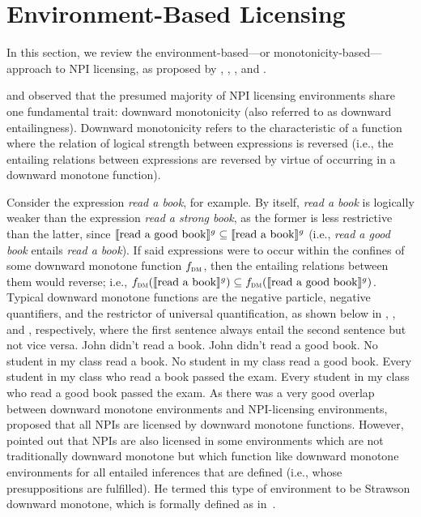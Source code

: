 \section{Environment-Based Licensing}
In this section, we review the environment-based---or monotonicity-based---approach to NPI licensing, as proposed by \textcite{Fauconnier1975a,Fauconnier1975b}, \textcite{Ladusaw1980}, \textcite{Giannakidou1998}, and \textcite{Fintel1999,Fintel2001}.

\textcite{Fauconnier1975a,Fauconnier1975b} and \textcite{Ladusaw1980} observed that the presumed majority of NPI licensing environments share one fundamental trait: downward monotonicity (also referred to as downward entailingness). Downward monotonicity refers to the characteristic of a function where the relation of logical strength between expressions is reversed (i.e., the entailing relations between expressions are reversed by virtue of occurring in a downward monotone function).
\ex\label{def:dm}%

\xe
Consider the expression \textit{read a book}, for example. By itself, \textit{read a book} is logically weaker than the expression \textit{read a strong book}, as the former is less restrictive than the latter, since $\llbracket\text{read a good book}\rrbracket^{g}\subseteq\llbracket\text{read a book}\rrbracket^{g}$ (i.e., \textit{read a good book} entails \textit{read a book}). If said expressions were to occur within the confines of some downward monotone function $f_\text{\scshape dm}$, then the entailing relations between them would reverse; i.e., $f_\text{\scshape dm}(\llbracket\text{read a book}\rrbracket^{g})\subseteq f_\text{\scshape dm}(\llbracket\text{read a good book}\rrbracket^{g})$. Typical downward monotone functions are the negative particle, negative quantifiers, and the restrictor of universal quantification, as shown below in , , and , respectively, where the first sentence always entail the second sentence but not vice versa.
\pex\label{ex:dm-neg}
\a John didn't read a book.
\a John didn't read a good book.
\xe
\pex\label{ex:dm-negquant}
\a No student in my class read a book.
\a No student in my class read a good book.
\xe
\pex\label{ex:dm-every}
\a Every student in my class who read a book passed the exam.
\a Every student in my class who read a good book passed the exam.
\xe
As there was a very good overlap between downward monotone environments and NPI-licensing environments, \textcite{Ladusaw1980} proposed that all NPIs are licensed by downward monotone functions. However, \textcite{Fintel1999} pointed out that NPIs are also licensed in some environments which are not traditionally downward monotone but which function like downward monotone environments for all entailed inferences that are defined (i.e., whose presuppositions are fulfilled). He termed this type of environment to be Strawson downward monotone, which is formally defined as in~.
